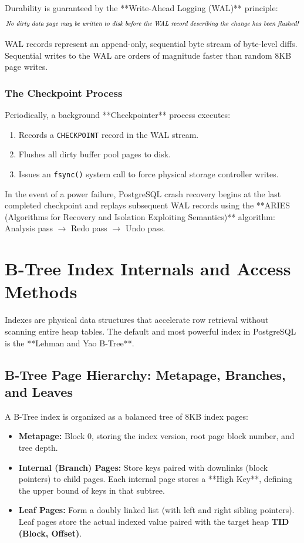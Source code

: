 Durability is guaranteed by the **Write-Ahead Logging (WAL)** principle:
$$\text{\textit{No dirty data page may be written to disk before the WAL record describing the change has been flushed!}}$$

WAL records represent an append-only, sequential byte stream of byte-level diffs. Sequential writes to the WAL are orders of magnitude faster than random 8KB page writes.

\subsubsection{The Checkpoint Process}
Periodically, a background **Checkpointer** process executes:
\begin{enumerate}[leftmargin=15pt]
  \item Records a \texttt{CHECKPOINT} record in the WAL stream.
  \item Flushes all dirty buffer pool pages to disk.
  \item Issues an \texttt{fsync()} system call to force physical storage controller writes.
\end{enumerate}
In the event of a power failure, PostgreSQL crash recovery begins at the last completed checkpoint and replays subsequent WAL records using the **ARIES (Algorithms for Recovery and Isolation Exploiting Semantics)** algorithm: Analysis pass $\rightarrow$ Redo pass $\rightarrow$ Undo pass.

\section{B-Tree Index Internals and Access Methods}

Indexes are physical data structures that accelerate row retrieval without scanning entire heap tables. The default and most powerful index in PostgreSQL is the **Lehman and Yao B-Tree**.

\subsection{B-Tree Page Hierarchy: Metapage, Branches, and Leaves}

A B-Tree index is organized as a balanced tree of 8KB index pages:
\begin{itemize}[leftmargin=15pt]
  \item \textbf{Metapage:} Block 0, storing the index version, root page block number, and tree depth.
  \item \textbf{Internal (Branch) Pages:} Store keys paired with downlinks (block pointers) to child pages. Each internal page stores a **High Key**, defining the upper bound of keys in that subtree.
  \item \textbf{Leaf Pages:} Form a doubly linked list (with left and right sibling pointers). Leaf pages store the actual indexed value paired with the target heap \textbf{TID (Block, Offset)}.
\end{itemize}

